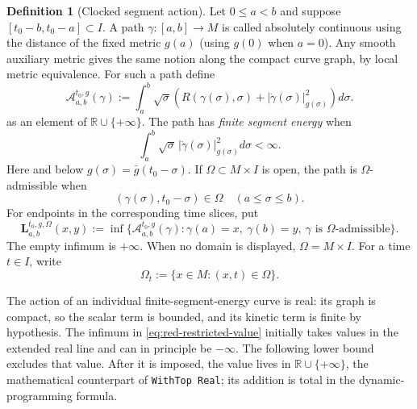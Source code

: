 \documentclass[10pt]{coll-l}
\theoremstyle{definition}
\newtheorem{definition}[theorem]{Definition}
\theoremstyle{remark}
\numberwithin{section}{chapter}
\numberwithin{equation}{chapter}
\begin{document}
\begin{definition}[Clocked segment action]
\label{def:red-clocked-action}
Let $0\leq a<b$ and suppose $[t_0-b,t_0-a]\subset I$.  A path
$\gamma:[a,b]\to M$ is called absolutely continuous using the distance of
the fixed metric $g(a)$ (using $g(0)$ when $a=0$).  Any smooth auxiliary
metric gives the same notion along the compact curve graph, by local metric
equivalence.  For such a path define
\begin{equation}
 \mathcal A^{t_0,g}_{a,b}(\gamma)
 :=\int_a^b\sqrt\sigma\left(
       R(\gamma(\sigma),\sigma)
       +|\dot\gamma(\sigma)|_{g(\sigma)}^2\right)d\sigma .
                                                               \label{eq:red-clocked-action}
\end{equation}
as an element of $\mathbb R\cup\{+\infty\}$.  The path has
\emph{finite segment energy} when
\begin{equation}
           \int_a^b\sqrt\sigma\,|\dot\gamma(\sigma)|^2_{g(\sigma)}
                    d\sigma<\infty.                    \label{eq:red-finite-segment-energy}
\end{equation}
Here and below $g(\sigma)=\bar g(t_0-\sigma)$.  If
$\Omega\subset M\times I$ is open, the path is $\Omega$-admissible when
\begin{equation}
                   (\gamma(\sigma),t_0-\sigma)\in\Omega
                   \quad(a\leq\sigma\leq b).             \label{eq:red-domain-admissible}
\end{equation}
For endpoints in the corresponding time slices, put
\begin{equation}
 \mathbf L^{t_0,g,\Omega}_{a,b}(x,y)
 :=\inf\{\mathcal A^{t_0,g}_{a,b}(\gamma):
       \gamma(a)=x,\ \gamma(b)=y,\ \gamma\text{ is }\Omega
       \text{-admissible}\}.                            \label{eq:red-restricted-value}
\end{equation}
The empty infimum is $+\infty$.  When no domain is displayed,
$\Omega=M\times I$.
For a time $t\in I$, write
\begin{equation}
                    \Omega_t:=\{x\in M:(x,t)\in\Omega\}.       \label{eq:red-domain-slice}
\end{equation}
\end{definition}

The action of an individual finite-segment-energy curve is real: its graph is
compact, so the scalar term is bounded, and its kinetic term is finite by
hypothesis.  The infimum in \eqref{eq:red-restricted-value} initially takes
values in the extended real line and can in principle be $-\infty$.  The
following lower bound excludes that value.  After it is imposed, the value
lives in $\mathbb R\cup\{+\infty\}$, the mathematical counterpart of
\texttt{WithTop Real}; its addition is total in the dynamic-programming
formula.
\end{document}
